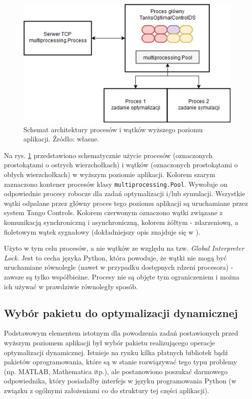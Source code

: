 \begin{figure}[ht]
    \centering
    \includegraphics[scale=0.8]{Grafika/tanks_opt_ctrl_architecture}
    \caption{Schemat architektury procesów i wątków wyższego poziomu aplikacji. Źródło: własne.}
    \label{fig:tanksoptctrlarchitecture}
\end{figure}

Na rys. \ref{fig:tanksoptctrlarchitecture} przedstawiono schematycznie użycie procesów (oznaczonych prostokątami o ostrych wierzchołkach) i wątków (oznaczonych prostokątami o obłych wierzchołkach) w wyższym poziomie aplikacji. Kolorem szarym zaznaczono kontener procesów klasy \texttt{multiprocessing.Pool}. Wywołuje on odpowiednie procesy robocze dla zadań optymalizacji i/lub symulacji. Wszystkie wątki odpalane przez główny proces tego poziomu aplikacji są uruchamiane przez system Tango Controls. Kolorem czerwonym oznaczono wątki związane z komunikacją synchroniczną i asynchroniczną, kolorem żółtym - zdarzeniową, a fioletowym wątek sygnałowy (dokładniejszy opis znajduje się w \cite{TangoDocs}).

Użyto w tym celu procesów, a nie wątków ze względu na tzw. \emph{Global Interpreter Lock}. Jest to cecha języka Python, która powoduje, że wątki nie mogą być uruchamiane równolegle (nawet w przypadku dostępnych rdzeni procesora) - zawsze są tylko współbieżne. Procesy nie są objęte tym ograniczeniem i można ich używać w prawdziwie równoległy sposób.


\subsection{Wybór pakietu do optymalizacji dynamicznej}
\label{sub:czesc-wyzsza-wybor}

Podstawowym elementem istotnym dla powodzenia zadań postawionych przed wyższym poziomem aplikacji był wybór pakietu realizującego operacje optymalizacji dynamicznej. Istnieje na rynku kilka płatnych bibliotek bądź pakietów oprogramowania, które są w stanie rozwiązywać tego typu problemy (np. MATLAB, Mathematica itp.), ale postanowiono poszukać darmowego odpowiednika, który posiadałby interfejs w języku programowania Python (w związku z ogólnymi założeniami co do struktury tej części aplikacji).


